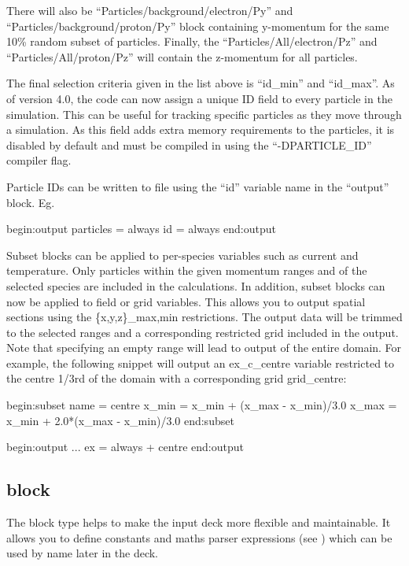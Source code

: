 There will also be ``Particles/background/electron/Py'' and
``Particles/background/proton/Py'' block containing y-momentum for the same
10\% random subset of particles.
Finally, the ``Particles/All/electron/Pz'' and ``Particles/All/proton/Pz'' will
contain the z-momentum for all particles.

The final selection criteria given in the list above is ``id\_min'' and
``id\_max''. As of {\EPOCH} version 4.0, the code can now assign a unique
ID field to every particle in the simulation. This can be useful for
tracking specific particles as they move through a simulation. As this
field adds extra memory requirements to the particles, it is disabled by
default and must be compiled in using the ``-DPARTICLE\_ID'' compiler flag.

Particle IDs can be written to file using the ``id'' variable name in
the ``output'' block.  Eg.
\begin{boxverbatim}
begin:output
   particles = always
   id = always
end:output
\end{boxverbatim}

Subset blocks can be applied to per-species variables such as current and
temperature. Only particles within the given momentum ranges and of the selected
species are included in the calculations. In addition, subset blocks can now
be applied to field or grid variables. This allows
you to output spatial sections using the {\emphtext \{x,y,z\}\_max,min}
restrictions.
The output data will be trimmed to the selected ranges and a corresponding
restricted grid included in the output. Note that specifying an empty range
will lead to output of the entire domain. For example, the following snippet
will output an ex\_c\_centre variable restricted to the centre 1/3rd of the
domain with a corresponding grid grid\_centre:

\begin{boxverbatim}
begin:subset
   name = centre
   x_min = x_min + (x_max - x_min)/3.0
   x_max = x_min + 2.0*(x_max - x_min)/3.0
end:subset

begin:output
   ...
   ex = always + centre
end:output
\end{boxverbatim}

\subsection{ block}
\label{sec:constant_block}

The  block type helps to make the input deck more flexible
and maintainable. It allows you to define constants and maths parser
expressions (see ) which can be used by name later in the
deck.\\

